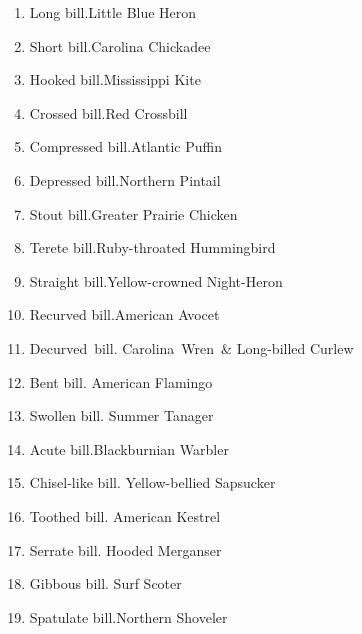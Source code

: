 \documentclass[11pt]{article}
\begin{document}
\thispagestyle{empty}

\setlength\columnsep{1.5cm}
\fontsize{18}{24}\selectfont 
\begin{multicols}{2}
\begin{enumerate}[itemsep=1cm]
\item Long bill.\newline Little Blue Heron
\item Short bill.\newline Carolina Chickadee
\item Hooked bill.\newline Mississippi Kite
\item Crossed bill.\newline Red Crossbill
\item Compressed bill.\newline Atlantic Puffin

\item Depressed bill.\newline Northern Pintail
\item Stout bill.\newline Greater Prairie Chicken
\item Terete bill.\newline Ruby-throated Hummingbird
\item Straight bill.\newline Yellow-crowned Night-Heron
\item Recurved bill.\newline American Avocet
\item Decurved~bill. Carolina~Wren~\& \newline Long-billed Curlew
\item Bent bill. \newline American Flamingo

\item Swollen bill. \newline Summer Tanager
\item Acute bill.\newline  Blackburnian Warbler
\item Chisel-like bill. \newline Yellow-bellied Sapsucker
\item Toothed bill. \newline American Kestrel
\item Serrate bill. \newline Hooded Merganser
\item Gibbous bill. \newline Surf Scoter
\item Spatulate bill.\newline  Northern Shoveler


\end{enumerate}
\end{multicols}
\end{document}

